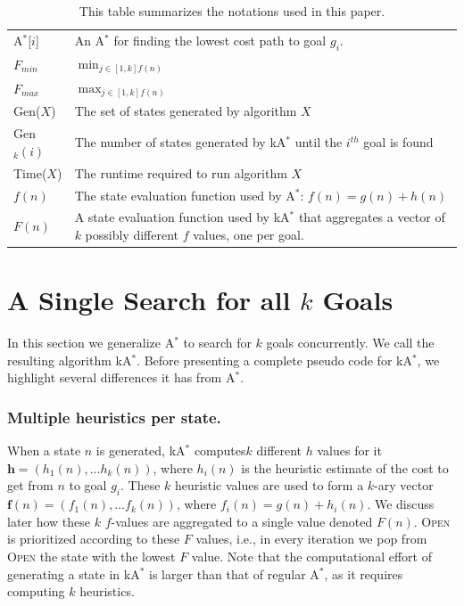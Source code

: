 \documentclass{aicom2e}
\newcommand{\astar}{A$^*$}
\newcommand{\kastar}{kA$^*$}
\newcommand{\astari}[1]{A$^*$[$#1$]}
\newcommand{\open}{\textsc{Open}}
\begin{document}
\begin{table}
\begin{tabular}{|l|l|}
        \hline
		\astari{i}  & An \astar{} for finding the lowest cost path to goal $g_i$. \\
		$F_{min}$   & $\min_{j\in[1,k] f(n)}$\\
        $F_{max}$   & $\max_{j\in[1,k] f(n)}$\\
        Gen($X$)    & The set of states generated by algorithm $X$ \\
        Gen$_k(i)$  & The number of states generated by \kastar{} until the $i^{th}$ goal is found\\
        Time($X$)   & The runtime required to run algorithm $X$ \\
        $f(n)$      & The state evaluation function used by \astar{}: $f(n)=g(n)+h(n)$ \\
        $F(n)$      & A state evaluation function used by \kastar{} that aggregates a vector of $k$ possibly different $f$ values, one per goal. \\
        \hline
    \end{tabular}
\caption{This table summarizes the notations used in this paper.}
\label{tab:notations} 
\end{table}


\section{A Single Search for all  $k$ Goals}
\label{sec:one-k-goal-search}

In this section we generalize \astar{} to search for $k$ goals concurrently. We
call the resulting algorithm \kastar{}. Before presenting a complete pseudo
code for \kastar{}, we highlight several differences it has from \astar{}.

\subsubsection*{Multiple heuristics per state.}


When a state $n$ is generated, \kastar{} computes$k$ different $h$ values for
it $\textbf{h}=(h_1(n),\ldots h_k(n))$, where $h_i(n)$ is the heuristic
estimate of the cost to get from $n$ to goal $g_i$. These $k$ heuristic values
are used to form a $k$-ary vector $\textbf{f}(n)=(f_1(n),\ldots f_k(n))$, where
$f_i(n)=g(n)+h_i(n)$. We discuss later how these $k$ $f$-values are aggregated
to a single value denoted $F(n)$.
\open{} is prioritized according to these $F$ values, i.e., in every iteration we
pop from \open{} the state with the lowest $F$ value. Note that the
computational effort of generating a state in \kastar{} is larger than that of
regular \astar{}, as it requires computing $k$ heuristics.
\end{document}
